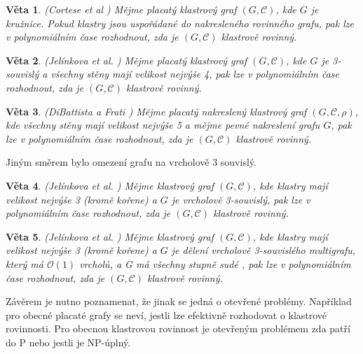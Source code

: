 \documentclass[12pt,a4report]{report}
\newtheorem{theorem}{Věta}[chapter]
\theoremstyle{definition}
\begin{document}
\begin{theorem}(Cortese et al \cite{CorteseEtAl09})
Mějme placatý klastrový graf  $(G, \mathcal C)$, kde $G$ je kružnice. Pokud klastry jsou uspořádané do nakresleného rovinného grafu, pak lze v polynomiálním čase rozhodnout, zda je  $(G, \mathcal C)$ klastrově rovinný.
\end{theorem}

\begin{theorem}(Jelínkova et al. \cite{JelinkovaEtAl07})
Mějme placatý klastrový graf  $(G, \mathcal C)$, kde $G$ je 3-souvislý a všechny stěny mají velikost nejvýše 4, pak lze v polynomiálním čase rozhodnout, zda je  $(G, \mathcal C)$ klastrově rovinný.
\end{theorem}

\begin{theorem}(DiBattista a Frati \cite{DiBattistaFrati07})
Mějme placatý nakreslený klastrový graf  $(G, \mathcal C, \rho)$, kde všechny stěny mají velikost nejvýše 5 a mějme pevné nakreslení grafu $G$, pak lze v polynomiálním čase rozhodnout, zda je  $(G, \mathcal C)$ klastrově rovinný.
\end{theorem}

Jiným směrem bylo omezení grafu na vrcholově 3 souvislý.

\begin{theorem}(Jelínkova et al. \cite{JelinkovaEtAl07})
Mějme klastrový graf $(G, \mathcal C)$, kde klastry mají velikost nejvýše 3 (kromě kořene) a $G$ je vrcholově 3-souvislý, pak lze v polynomiálním čase rozhodnout, zda je  $(G, \mathcal C)$ klastrově rovinný. 
\end{theorem}

\begin{theorem}(Jelínkova et al. \cite{JelinkovaEtAl07})
Mějme klastrový graf $(G, \mathcal C)$, kde klastry mají velikost nejvýše 3 (kromě kořene) a $G$ je dělení vrcholově 3-souvislého multigrafu, který má $\mathcal O(1)$ vrcholů, a G má všechny stupně sudé , pak lze v polynomiálním čase rozhodnout, zda je  $(G, \mathcal C)$ klastrově rovinný. 
\end{theorem}

Závěrem je nutno poznamenat, že jinak se jedná o otevřené problémy. Například pro obecné placaté grafy se neví, jestli lze efektivně rozhodovat o klastrové rovinnosti. Pro obecnou klastrovou rovinnost je otevřeným problémem zda patří do P nebo jestli je NP-úplný.

\end{document}
